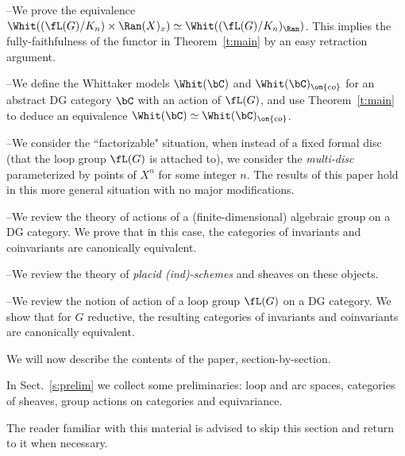 \documentclass[9pt]{amsart}
\theoremstyle{definition}
\theoremstyle{remark}
\newcommand{\thmref}[1]{Theorem~\ref{#1}}
\newcommand{\secref}[1]{Sect.~\ref{#1}}
\numberwithin{equation}{section}
\begin{document}
\medskip

\noindent--We prove the equivalence $\Whit((\fL(G)/K_n)\times \Ran(X)_x)\simeq \Whit((\fL(G)/K_n)_{\Ran})$. This implies the 
fully-faithfulness of the functor in \thmref{t:main} by an easy retraction argument. 

 \hfill

\medskip

\noindent--We define the Whittaker models $\Whit(\bC)$ and $\Whit(\bC)_{\on{co}}$ for an abstract DG category $\bC$ with
an action of $\fL(G)$, and use \thmref{t:main} to deduce an equivalence $\Whit(\bC)\simeq \Whit(\bC)_{\on{co}}$. 

\medskip

\noindent--We consider the ``factorizable" situation, when instead of a fixed formal disc (that the loop group $\fL(G)$ 
is attached to), we consider the \emph{multi-disc} parameterized by points of $X^n$ for some integer $n$. The results
of this paper hold in this more general situation with no major modifications. 

 \hfill

\medskip

\noindent--We review the theory of actions of a (finite-dimensional) algebraic group on a DG category. We prove
that in this case, the categories of invariants and coinvariants are canonically equivalent.

\medskip

\noindent--We review the theory of \emph{placid (ind)-schemes} and sheaves on these objects. 

\medskip

\noindent--We review the notion of action of a loop group $\fL(G)$ on a DG category.  We show that for $G$
reductive, the resulting categories of invariants and coinvariants are canonically equivalent.


We will now describe the contents of the paper, section-by-section.

\sssec{}

In \secref{s:prelim} we collect some preliminaries: loop and arc spaces, categories of sheaves, group actions on categories and
equivariance.

\medskip

The reader familiar with this material is advised to skip this section and return to it when necessary. 

\sssec{}
\end{document}
